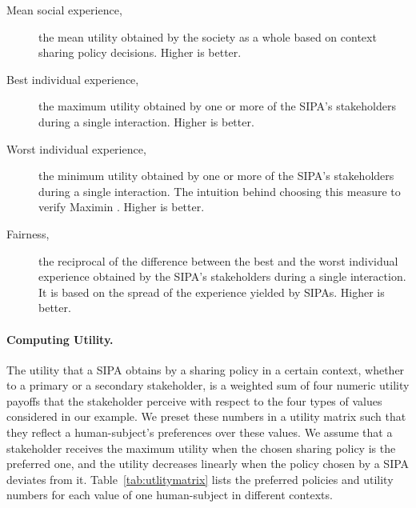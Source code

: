\begin{description}
\item[Mean social experience,] the mean utility obtained by the society as a whole based on context sharing policy decisions. Higher is better.
\item[Best individual experience,] the maximum utility obtained by one or more of the SIPA's stakeholders during a single interaction. Higher is better.
\item[Worst individual experience,] the minimum utility obtained by one or more of the SIPA's stakeholders during a single interaction. The intuition behind choosing this measure to verify Maximin \citep{Leben2017Rawls}. Higher is better. 
\item[Fairness,] the reciprocal of the difference between the best and the worst individual experience obtained by the SIPA's stakeholders during a single interaction. It is based on the spread of the experience yielded by SIPAs. Higher is better. \citep{rawls1985justice}
\end{description}

\paragraph*{Computing Utility.} The utility that a SIPA obtains by a sharing policy in a certain context, whether to a primary or a secondary stakeholder, 
is a weighted sum of four numeric utility payoffs that the stakeholder perceive with respect to the four types of values considered in our example. We preset these numbers in a utility matrix such that they reflect a human-subject's preferences over these values. We assume that a stakeholder receives the maximum utility when the chosen sharing policy is the preferred one, and the utility decreases linearly when the policy chosen by a SIPA deviates from it. Table~\ref{tab:utlitymatrix} lists the preferred policies and utility numbers for each value of one human-subject in different contexts. 

